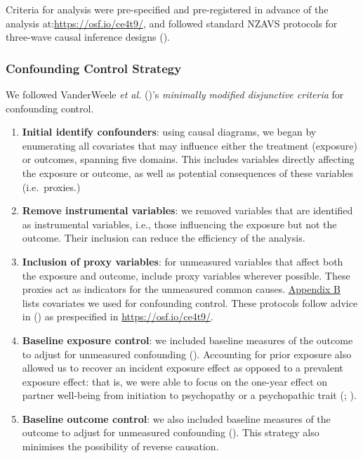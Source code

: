 \documentclass[
  singlecolumn]{article}
\begin{document}
Criteria for analysis were pre-specified and pre-registered in advance
of the analysis at:\url{https://osf.io/ce4t9/}, and followed standard
NZAVS protocols for three-wave causal inference designs
().

\subsubsection{Confounding Control
Strategy}\label{confounding-control-strategy}

We followed VanderWeele \emph{et al.}
()'s \emph{minimally modified
disjunctive criteria} for confounding control.

\begin{enumerate}
\def\labelenumi{\arabic{enumi}.}
\item
  \textbf{Initial identify confounders}: using causal diagrams, we began
  by enumerating all covariates that may influence either the treatment
  (exposure) or outcomes, spanning five domains. This includes variables
  directly affecting the exposure or outcome, as well as potential
  consequences of these variables (i.e.~proxies.)
\item
  \textbf{Remove instrumental variables}: we removed variables that are
  identified as instrumental variables, i.e., those influencing the
  exposure but not the outcome. Their inclusion can reduce the
  efficiency of the analysis.
\item
  \textbf{Inclusion of proxy variables}: for unmeasured variables that
  affect both the exposure and outcome, include proxy variables wherever
  possible. These proxies act as indicators for the unmeasured common
  causes. \hyperref[appendix-demographics]{Appendix B} lists covariates
  we used for confounding control. These protocols follow advice in
  () as prespecified
  in \url{https://osf.io/ce4t9/}.
\item
  \textbf{Baseline exposure control}: we included baseline measures of
  the outcome to adjust for unmeasured confounding
  ().
  Accounting for prior exposure also allowed us to recover an incident
  exposure effect as opposed to a prevalent exposure effect: that is, we
  were able to focus on the one-year effect on partner well-being from
  initiation to psychopathy or a psychopathic trait
  (;
  ).
\item
  \textbf{Baseline outcome control}: we also included baseline measures
  of the outcome to adjust for unmeasured confounding
  (). This
  strategy also minimises the possibility of reverse causation.
\end{enumerate}
\end{document}
